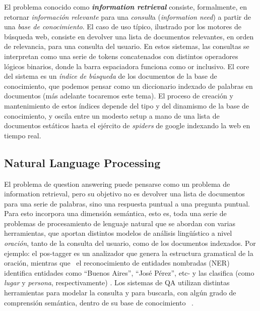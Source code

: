 El problema conocido como\textbf{ }\textbf{\textit{information
retrieval}} consiste, formalmente, en retornar \textit{informaci\'on
relevante} para una \textit{consult}a (\textit{information need}) a
partir de una \textit{base de conocimiento}. El caso de uso t\'ipico,
ilustrado por los motores de b\'usqueda web, consiste en devolver una
lista de documentos relevantes, en orden de relevancia, para una
consulta del usuario. En estos sistemas, las consultas se interpretan
como una serie de tokens concatenados con distintos operadores
l\'ogicos binarios, donde la barra espaciadora funciona como or
inclusivo. El core del sistema es un\textit{ \'indice} \textit{de
b\'usqueda} de los documentos de la base de conocimiento, que podemos pensar como 
un diccionario indexado de palabras en documentos (m\'as adelante tocaremos este tema). El
proceso de creaci\'on y mantenimiento de estos \'indices depende del
tipo y del dinamismo de la base de conocimiento, y oscila entre un
modesto setup a mano de una lista de documentos est\'aticos hasta el
ej\'ercito de \textit{spiders} de google indexando la web en tiempo
real. 


\bigskip

\subsection{Natural Language Processing}

El problema de question answering puede pensarse como un problema de information
retrieval, pero su objetivo no es devolver una lista de documentos para
una serie de palabras, sino una respuesta puntual a una pregunta
puntual. Para esto incorpora una dimensi\'on sem\'antica, esto es, toda
una serie de problemas de procesamiento de lenguaje natural que se
abordan con varias herramientas, que aportan distintos modelos de
an\'alisis ling\"u\'istico a nivel \textit{oraci\'on}, tanto de la
consulta del usuario, como de los documentos indexados. Por ejemplo: el
pos-tagger es un analizador que genera la estructura gramatical de la
oraci\'on, mientras que \ el reconocimiento de entidades nombradas
(NER) identifica entidades como {\textquotedblleft}Buenos
Aires{\textquotedblright}, {\textquotedblleft}Jos\'e
P\'erez{\textquotedblright}, etc- y las clasifica (como \textit{lugar}
y \textit{persona}, respectivamente) . Los sistemas de QA utilizan
distintas herramientas para modelar la consulta y para buscarla, con
alg\'un grado de comprensi\'on sem\'antica, dentro de su base de
conocimiento \ .


\bigskip

